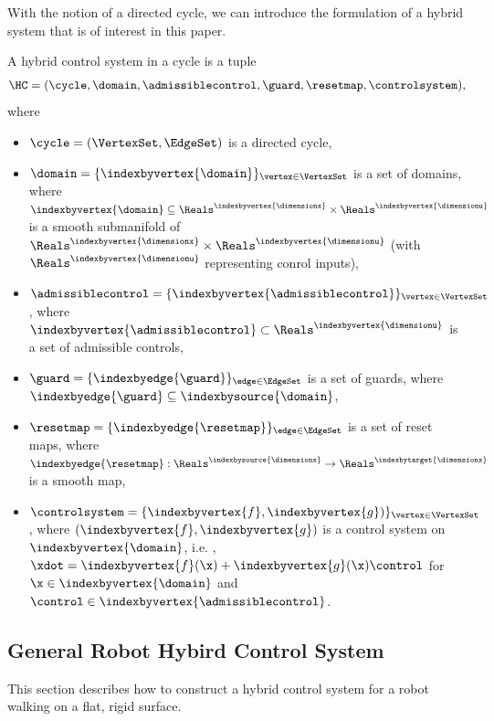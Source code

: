 With the notion of a directed cycle, we can introduce the formulation of a hybrid system that is of interest in this paper.
\begin{mydefinition}
 A hybrid control system in a cycle is a tuple
 \begin{align}
  \HC = (\cycle, \domain, \admissiblecontrol, \guard, \resetmap, \controlsystem),
 \end{align}
 where
 \begin{itemize}
  \item $\cycle = (\VertexSet, \EdgeSet)$ is a directed cycle,
  \item $\domain = \{ \indexbyvertex{\domain} \}_{\vertex \in \VertexSet}$ is a set of domains, where $\indexbyvertex{\domain} \subseteq \Reals^{\indexbyvertex{\dimensionx}} \times \Reals^{\indexbyvertex{\dimensionu}}$ is a smooth submanifold of $\Reals^{\indexbyvertex{\dimensionx}} \times \Reals^{\indexbyvertex{\dimensionu}}$ (with $\Reals^{\indexbyvertex{\dimensionu}}$ representing conrol inputs),
  \item $\admissiblecontrol = \{ \indexbyvertex{\admissiblecontrol} \}_{\vertex \in \VertexSet}$, where $\indexbyvertex{\admissiblecontrol} \subset \Reals^{\indexbyvertex{\dimensionu}}$ is a set of admissible controls,
  \item $ \guard = \{ \indexbyedge{ \guard} \}_{\edge \in \EdgeSet}$ is a set of guards, where $\indexbyedge{\guard} \subseteq \indexbysource{\domain}$,
  \item $\resetmap = \{ \indexbyedge{\resetmap} \}_{\edge \in \EdgeSet}$ is a set of reset maps, where $\indexbyedge{\resetmap}: \Reals^{\indexbysource{\dimensionx}} \to \Reals^{\indexbytarget{\dimensionx}}$ is a smooth map,
  \item $\controlsystem = \{ \indexbyvertex{f},\indexbyvertex{g} ) \}_{\vertex \in \VertexSet}$, where $(\indexbyvertex{f}, \indexbyvertex{g})$ is a control system on $\indexbyvertex{\domain}$, i.e. , $\xdot = \indexbyvertex{f}(\x) + \indexbyvertex{g} (\x) \control$ for $\x \in \indexbyvertex{\domain}$ and $\control \in \indexbyvertex{\admissiblecontrol}$.
 \end{itemize}

\end{mydefinition}

\subsection{General Robot Hybird Control System}
This section describes how to construct a hybrid control system for a robot walking on a flat, rigid surface.

